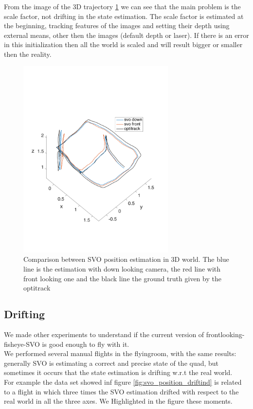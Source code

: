 From the image of the 3D trajectory \ref{fig:comparision_svo_trajectory} we can see that the main problem is the scale factor, not drifting in the state estimation. The scale factor is estimated at the beginning, tracking features of the images and setting their depth using external means, other then the images (default depth or laser). If there is an error in this initialization then all the world is scaled and will result bigger or smaller then the reality.
\begin{figure}[!htbp]
    \centering
    \includegraphics[width=0.7\textwidth]{img/comparision_between_two_svo_and_opti_trajectory.pdf}
    \caption{Comparison between SVO position estimation in 3D world. The blue line is the estimation with down looking camera, the red line with front looking one and the black line the ground truth given by the optitrack}
    \label{fig:comparision_svo_trajectory}
\end{figure}


\subsection{Drifting}
We made other experiments to understand if the current version of frontlooking-fisheye-SVO is good enough to fly with it.\\ 
We performed several manual flights in the flyingroom, with the same results: generally SVO is estimating a correct and precise state of the quad, but sometimes it occurs that the state estimation is drifting w.r.t the real world.\\
For example the data set showed inf figure \ref{fig:svo_position_driftind} is related to a flight in which three times the SVO estimation drifted with respect to the real world in all the three axes. We Highlighted in the figure these moments.\\

